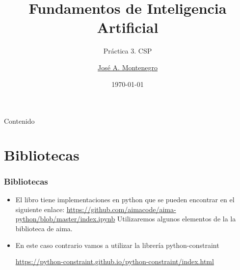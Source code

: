\documentclass[xcolor=table]{beamer}
\title{Fundamentos de Inteligencia Artificial}
\subtitle{Práctica 3. CSP}
\author{\href{mailto:jmmontes@uma.es}{José A. Montenegro}}
\date{\today}
\begin{document}
\newtheorem{mydef}{Definición}[section] %
\maketitle




\small


\begin{frame}{Contenido}
\tableofcontents
\end{frame}


\section{Bibliotecas}



\begin{frame} \frametitle{Bibliotecas} 

\begin{itemize}
    \item El libro tiene implementaciones en python que se pueden encontrar en el siguiente enlace:
\url{https://github.com/aimacode/aima-python/blob/master/index.ipynb}
Utilizaremos algunos elementos de la la biblioteca de aima.


\item En este caso contrario vamos a utilizar la librería python-constraint

\url{https://python-constraint.github.io/python-constraint/index.html}

\end{itemize}


\end{frame} 
\end{document}
